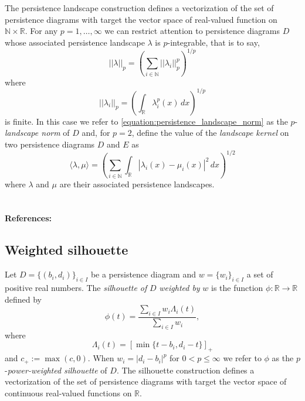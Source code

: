 \documentclass{amsart}
\begin{document}
	The persistence landscape construction defines a
	vectorization of the set of persistence diagrams with target the vector space of real-valued function on $\mathbb N \times \mathbb R$. For any $p = 1,\dots,\infty$ we can restrict attention to persistence diagrams $D$ whose associated persistence landscape $\lambda$ is
	$p$-integrable, that is to say,	
	\begin{equation} \label{equation:persistence_landscape_norm}	
	||\lambda||_p = \left( \sum_{i \in \mathbb N} ||\lambda_i||^p_p \right)^{1/p}	
	\end{equation}	
	where
	\begin{equation*}	
	||\lambda_i||_p = \left( \int_{\mathbb R} \lambda_i^p(x)\, dx \right)^{1/p}	
	\end{equation*}	
	is finite. In this case we refer to \eqref{equation:persistence_landscape_norm} as the $p$-\textit{landscape norm} of $D$ and, for $p = 2$, define the value of the \textit{landscape kernel} on two persistence diagrams $D$ and $E$ as
	\begin{equation*}
	\langle \lambda, \mu \rangle = \left(\sum_{i \in \mathbb N} \int_{\mathbb R} |\lambda_i(x) - \mu_i(x)|^2\, dx\right)^{1/2}
	\end{equation*}
	where $\lambda$ and $\mu$ are their associated persistence landscapes.

	\paragraph{\\ References:} \cite{bubenik2015statistical}
	
	\subsection*{Weighted silhouette} \label{weighted_silhouette}
	
	Let $D = \{(b_i, d_i)\}_{i \in I}$ be a
	persistence diagram and $w = \{w_i\}_{i \in I}$ a set of positive real numbers. The \textit{silhouette of} $D$ \textit{weighted by} $w$ is the function $\phi : \mathbb R \to \mathbb R$ defined by
	\begin{equation*}	
	\phi(t) = \frac{\sum_{i \in I}w_i \Lambda_i(t)}{\sum_{i \in I}w_i},	
	\end{equation*}	
	where	
	\begin{equation*}
	\Lambda_i(t) = \left[ \min \{t-b_i, d_i-t\}\right]_+	
	\end{equation*}	
	and $c_+ := \max(c,0)$. When $w_i = \vert d_i - b_i \vert^p$ for $0 < p \leq \infty$ we refer to $\phi$ as the $p$-\textit{power-weighted silhouette} of $D$. The silhouette construction defines a
	vectorization of the set of persistence diagrams with target the vector space of continuous real-valued functions on $\mathbb R$.
	
\end{document}
